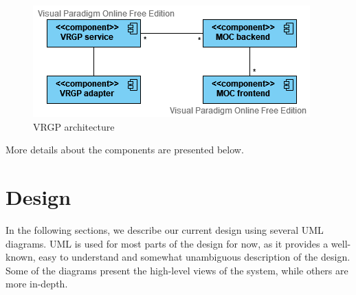 \begin{figure}[ht]
	\centering
	\includegraphics[width=\linewidth]{images/vrgp-architecture}
	\caption{VRGP architecture}
	\label{fig:vrgp-architecture}
\end{figure}


More details about the components are presented below.

\section{Design}\label{sec:design}

In the following sections, we describe our current design using several UML diagrams. UML is used for most parts of the design for now, as it provides a well-known, easy to understand and somewhat unambiguous description of the design. Some of the diagrams present the high-level views of the system, while others are more in-depth.

